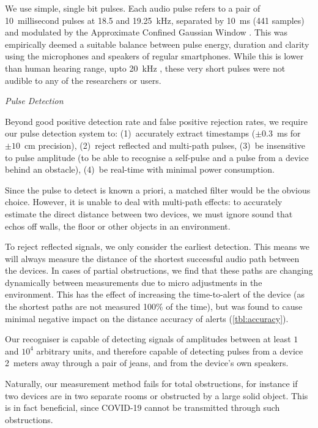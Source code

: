 \documentclass{article}
\begin{document}
We use simple, single bit pulses. Each audio pulse refers to a pair of 10~millisecond pulses at 18.5 and 19.25~kHz, separated by 10~ms (441 samples) and modulated by the Approximate Confined Gaussian Window \cite{Starosielec2014}. This was empirically deemed a suitable balance between pulse energy, duration and clarity using the microphones and speakers of regular smartphones. While this is lower than human hearing range, upto 20~kHz \cite{rosen2011signals}, these very short pulses were not audible to any of the researchers or users.

\emph{Pulse Detection}

Beyond good positive detection rate and false positive rejection rates, we require our pulse detection system to: (1)~accurately extract timestamps ($\pm 0.3$~ms for $\pm 10$~cm precision), (2)~reject reflected and multi-path pulses, (3)~be insensitive to pulse amplitude (to be able to recognise a self-pulse and a pulse from a device behind an obstacle), (4)~be real-time with minimal power consumption.

Since the pulse to detect is known a priori, a matched filter would be the obvious choice. However, it is unable to deal with multi-path effects: to accurately estimate the direct distance between two devices, we must ignore sound that echos off walls, the floor or other objects in an environment.

To reject reflected signals, we only consider the earliest detection. This means we will always measure the distance of the shortest successful audio path between the devices. In cases of partial obstructions, we find that these paths are changing dynamically between measurements due to micro adjustments in the environment. This has the effect of increasing the time-to-alert of the device (as the shortest paths are not measured 100\% of the time), but was found to cause minimal negative impact on the distance accuracy of alerts (\cref{tbl:accuracy}). 

Our recogniser is capable of detecting signals of amplitudes between at least $1$ and $10^4$ arbitrary units, and therefore capable of detecting pulses from a device 2~meters away through a pair of jeans, and from the device's own speakers.

Naturally, our measurement method fails for total obstructions, for instance if two devices are in two separate rooms or obstructed by a large solid object. This is in fact beneficial, since COVID-19 cannot be transmitted through such obstructions. 
\end{document}
